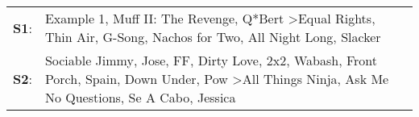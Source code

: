 \begin{supertabular}{p{0.03\textwidth}p{0.92\textwidth}}
 \textbf{S1}:  &                                                                                                                                                                          Example 1\textsuperscript{}, \enspace Muff II: The Revenge\textsuperscript{}, \enspace Q*Bert\textsuperscript{} \textgreater \enspace Equal Rights\textsuperscript{}, \enspace Thin Air\textsuperscript{}, \enspace G-Song\textsuperscript{}, \enspace Nachos for Two\textsuperscript{}, \enspace All Night Long\textsuperscript{}, \enspace Slacker\textsuperscript{}  \enspace  \\
 \textbf{S2}:  &  Sociable Jimmy\textsuperscript{}, \enspace Jose\textsuperscript{}, \enspace FF\textsuperscript{}, \enspace Dirty Love\textsuperscript{}, \enspace 2x2\textsuperscript{}, \enspace Wabash\textsuperscript{}, \enspace Front Porch\textsuperscript{}, \enspace Spain\textsuperscript{}, \enspace Down Under\textsuperscript{}, \enspace Pow\textsuperscript{} \textgreater \enspace All Things Ninja\textsuperscript{}, \enspace Ask Me No Questions\textsuperscript{}, \enspace Se A Cabo\textsuperscript{}, \enspace Jessica\textsuperscript{}  \enspace  \\
\end{supertabular}
